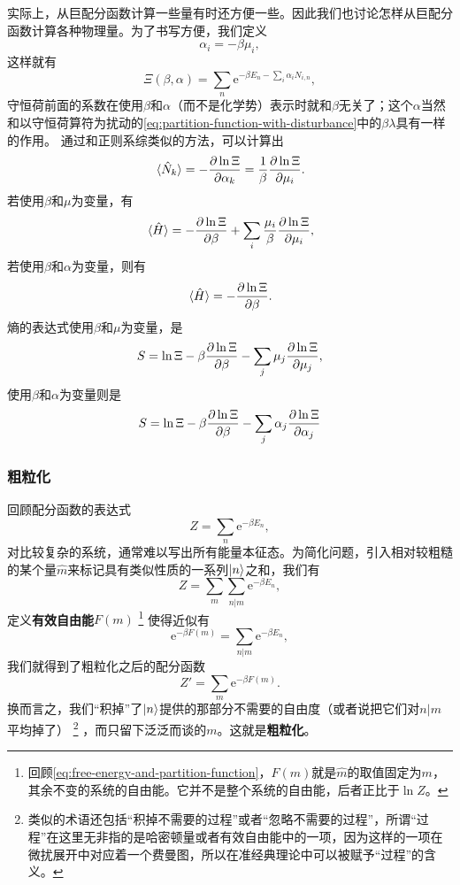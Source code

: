 \documentclass[hyperref, UTF8, a4paper]{ctexart}
\newcommand*{\ee}{\mathrm{e}}
\begin{document}
实际上，从巨配分函数计算一些量有时还方便一些。因此我们也讨论怎样从巨配分函数计算各种物理量。为了书写方便，我们定义
\begin{equation}
    \alpha_i = - \beta \mu_i,
\end{equation}
这样就有
\begin{equation}
    \Xi(\beta, \alpha) = \sum_n \ee^{-\beta E_n - \sum_i \alpha_i N_{i,n}},
\end{equation}
守恒荷前面的系数在使用$\beta$和$\alpha$（而不是化学势）表示时就和$\beta$无关了；这个$\alpha$当然和以守恒荷算符为扰动的\eqref{eq:partition-function-with-disturbance}中的$\beta\lambda$具有一样的作用。
通过和正则系综类似的方法，可以计算出
\begin{equation}
    \expval*{\hat{N}_k} = - \pdv{\ln \Xi}{\alpha_k} = \frac{1}{\beta} \pdv{\ln \Xi}{\mu_i}.
    \label{eq:expectation-of-charge-grand}
\end{equation}
若使用$\beta$和$\mu$为变量，有
\begin{equation}
    \expval*{\hat{H}} = - \pdv{\ln \Xi}{\beta} + \sum_i \frac{\mu_i}{\beta} \pdv{\ln \Xi}{\mu_i},
\end{equation}
若使用$\beta$和$\alpha$为变量，则有
\begin{equation}
    \expval*{\hat{H}} = - \pdv{\ln \Xi}{\beta}.
    \label{eq:expactation-of-energy-grand}
\end{equation}
熵的表达式使用$\beta$和$\mu$为变量，是
\begin{equation}
    S = \ln \Xi - \beta \pdv{\ln \Xi}{\beta} - \sum_j \mu_j \pdv{\ln \Xi}{\mu_j},
    \label{eq:entropy-mu-beta}
\end{equation}
使用$\beta$和$\alpha$为变量则是
\begin{equation}
    S = \ln \Xi - \beta \pdv{\ln \Xi}{\beta} - \sum_j \alpha_j \pdv{\ln \Xi}{\alpha_j}
\end{equation}

\subsubsection{粗粒化}


回顾配分函数的表达式
\[
    Z = \sum_n \ee^{- \beta E_n},
\]
对比较复杂的系统，通常难以写出所有能量本征态。为简化问题，引入相对较粗糙的某个量$\hat{m}$来标记具有类似性质的一系列$\ket{n}$之和，我们有
\[
    Z = \sum_m \sum_{n|m} \ee^{- \beta E_n},
\]
定义\textbf{有效自由能}$F(m)$%
\footnote{回顾\eqref{eq:free-energy-and-partition-function}，$F(m)$就是$\hat{m}$的取值固定为$m$，其余不变的系统的自由能。它并不是整个系统的自由能，后者正比于$\ln Z$。
}%
使得近似有
\[
    \ee^{- \beta F(m)} = \sum_{n|m} \ee^{- \beta E_n},
\]
我们就得到了粗粒化之后的配分函数
\[
    Z' = \sum_m \ee^{- \beta F(m)}.
\]
换而言之，我们“积掉”了$\ket{n}$提供的那部分不需要的自由度（或者说把它们对$n|m$平均掉了）%
\footnote{类似的术语还包括“积掉不需要的过程”或者“忽略不需要的过程”，所谓“过程”在这里无非指的是哈密顿量或者有效自由能中的一项，因为这样的一项在微扰展开中对应着一个费曼图，所以在准经典理论中可以被赋予“过程”的含义。}%
，而只留下泛泛而谈的$m$。这就是\textbf{粗粒化}。
\end{document}
